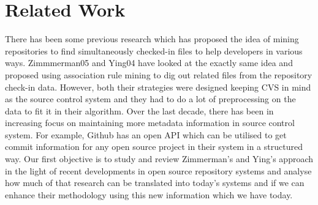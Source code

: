 
\section{Related Work}
\label{sec:related}

There has been some previous research which has proposed the idea of mining repositories to find simultaneously checked-in files to help developers in various ways. Zimmmerman05 and Ying04 have looked at the exactly same idea and proposed using association rule mining to dig out related files from the repository check-in data. However, both their strategies were designed keeping CVS in mind as the source control system and they had to do a lot of preprocessing on the data to fit it in their algorithm. Over the last decade, there has been in increasing focus on maintaining more metadata information in source control system. For example, Github has an open API which can be utilised to get commit information for any open source project in their system in a structured way. Our first objective is to study and review Zimmerman's and Ying's approach in the light of recent developments in open source repository systems and analyse how much of that research can be translated into today's systems and if we can enhance their methodology using this new information which we have today.